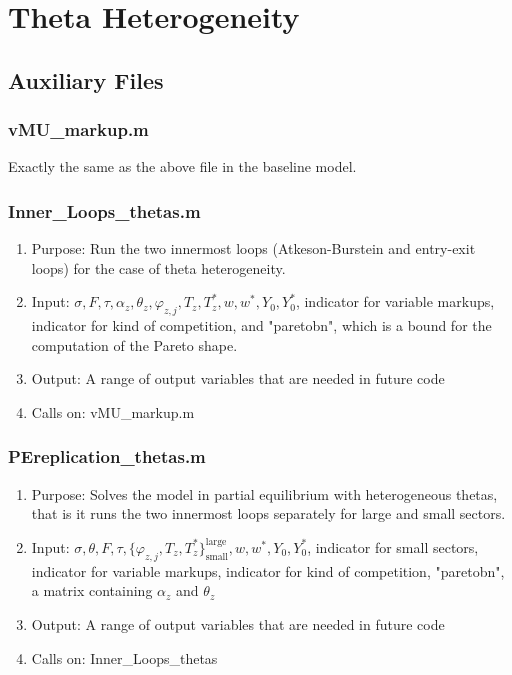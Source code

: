 \documentclass[12pt,a4paper,oneside]{article}
\begin{document}
\section{Theta Heterogeneity}

\subsection{Auxiliary Files}

\subsubsection{vMU\_markup.m}
Exactly the same as the above file in the baseline model.
\subsubsection{Inner\_Loops\_thetas.m}
\begin{enumerate}
\item Purpose: Run the two innermost loops (Atkeson-Burstein and entry-exit loops) for the case of theta heterogeneity.
\item Input: $\sigma, F, \tau, \alpha_z, \theta_z, \varphi_{z,j}, T_z, T_z^*, w, w^*, Y_0, Y_0^*$, indicator for variable markups, indicator for kind of competition, and "paretobn", which is a bound for the computation of the Pareto shape.
\item Output: A range of output variables that are needed in future code
\item Calls on: vMU\_markup.m
\end{enumerate}
\subsubsection{PEreplication\_thetas.m}
\begin{enumerate}
\item Purpose: Solves the model in partial equilibrium with heterogeneous thetas, that is it runs the two innermost loops separately for large and small sectors.
\item Input: $\sigma, \theta, F, \tau, \{\varphi_{z,j}, T_z, T_z^*\}_{\text{small}}^{\text{large}}, w, w^*, Y_0, Y_0^*$, indicator for small sectors, indicator for variable markups, indicator for kind of competition, "paretobn", a matrix containing $\alpha_z$ and $\theta_z$
\item Output: A range of output variables that are needed in future code
\item Calls on: Inner\_Loops\_thetas
\end{enumerate}
\end{document}
